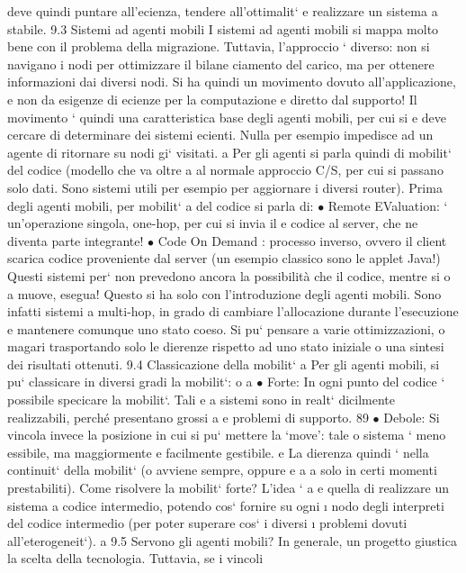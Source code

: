 \documentclass[a4paper,12pt]{article}
\begin{document}
deve quindi puntare all'ecienza, tendere all'ottimalit` e realizzare un sistema
a
stabile.
9.3
Sistemi ad agenti mobili
I sistemi ad agenti mobili si mappa molto bene con il problema della migrazione.
Tuttavia, l'approccio ` diverso: non si navigano i nodi per ottimizzare il bilane
ciamento del carico, ma per ottenere informazioni dai diversi nodi. Si ha quindi
un movimento dovuto all'applicazione, e non da esigenze di ecienze per la
computazione e diretto dal supporto!
Il movimento ` quindi una caratteristica base degli agenti mobili, per cui si
e
deve cercare di determinare dei sistemi ecienti. Nulla per esempio impedisce
ad un agente di ritornare su nodi gi` visitati.
a
Per gli agenti si parla quindi di mobilit` del codice (modello che va oltre
a
al normale approccio C/S, per cui si passano solo dati. Sono sistemi utili per
esempio per aggiornare i diversi router). Prima degli agenti mobili, per mobilit`
a
del codice si parla di:
$\bullet$ Remote EValuation: ` un'operazione singola, one-hop, per cui si invia il
e
codice al server, che ne diventa parte integrante!
$\bullet$ Code On Demand : processo inverso, ovvero il client scarica codice proveniente dal server (un esempio classico
sono le applet Java!)
Questi sistemi per` non prevedono ancora la possibilità che il codice, mentre si
o
a
muove, esegua! Questo si ha solo con l'introduzione degli agenti mobili. Sono infatti sistemi a multi-hop, in grado di
cambiare l'allocazione durante l'esecuzione
e mantenere comunque uno stato coeso. Si pu` pensare a varie ottimizzazioni,
o
magari trasportando solo le dierenze rispetto ad uno stato iniziale o una sintesi
dei risultati ottenuti.
9.4
Classicazione della mobilit`
a
Per gli agenti mobili, si pu` classicare in diversi gradi la mobilit`:
o
a
$\bullet$ Forte: In ogni punto del codice ` possibile specicare la mobilit`. Tali
e
a
sistemi sono in realt` dicilmente realizzabili, perché presentano grossi
a
e
problemi di supporto.
89
$\bullet$ Debole: Si vincola invece la posizione in cui si pu` mettere la {`}move': tale
o
sistema ` meno essibile, ma maggiormente e facilmente gestibile.
e
La dierenza quindi ` nella continuit` della mobilit` (o avviene sempre, oppure
e
a
a
solo in certi momenti prestabiliti). Come risolvere la mobilit` forte? L'idea `
a
e
quella di realizzare un sistema a codice intermedio, potendo cos` fornire su ogni
\i{}
nodo degli interpreti del codice intermedio (per poter superare cos` i diversi
\i{}
problemi dovuti all'eterogeneit`).
a
9.5
Servono gli agenti mobili?
In generale, un progetto giustica la scelta della tecnologia. Tuttavia, se i vincoli
\end{document}
